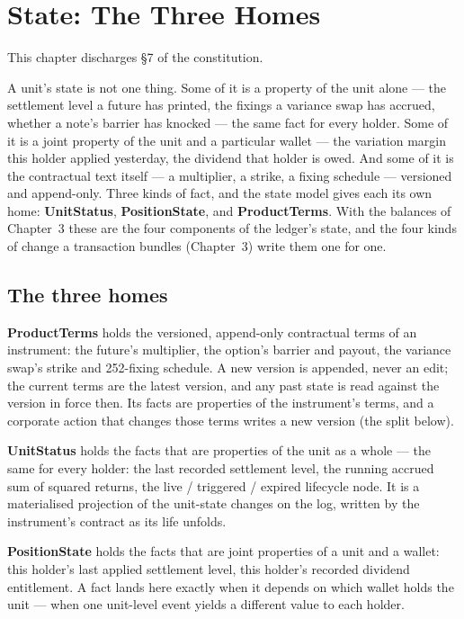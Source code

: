 \section{State: The Three Homes}\label{ch:homes}

This chapter discharges \S 7 of the constitution.

A unit's state is not one thing. Some of it is a property of the unit alone --- the
settlement level a future has printed, the fixings a variance swap has accrued, whether a
note's barrier has knocked --- the same fact for every holder. Some of it is a joint
property of the unit and a particular wallet --- the variation margin this holder applied
yesterday, the dividend that holder is owed. And some of it is the contractual text
itself --- a multiplier, a strike, a fixing schedule --- versioned and append-only. Three
kinds of fact, and the state model gives each its own home: \textbf{UnitStatus},
\textbf{PositionState}, and \textbf{ProductTerms}. With the balances of Chapter~3
these are the four components of the ledger's state, and the four kinds of change a
transaction bundles (Chapter~3) write them one for one.

\subsection{The three homes}

\textbf{ProductTerms} holds the versioned, append-only contractual terms of an
instrument: the future's multiplier, the option's barrier and payout, the variance swap's
strike and 252-fixing schedule. A new version is appended, never an edit; the current
terms are the latest version, and any past state is read against the version in force
then. Its facts are properties of the instrument's terms, and a corporate action that
changes those terms writes a new version (the split below).

\textbf{UnitStatus} holds the facts that are properties of the unit as a whole --- the
same for every holder: the last recorded settlement level, the running accrued sum of
squared returns, the live / triggered / expired lifecycle node. It is a materialised
projection of the unit-state changes on the log, written by the instrument's contract as
its life unfolds.

\textbf{PositionState} holds the facts that are joint properties of a unit and a wallet:
this holder's last applied settlement level, this holder's recorded dividend entitlement.
A fact lands here exactly when it depends on which wallet holds the unit --- when one
unit-level event yields a different value to each holder.

